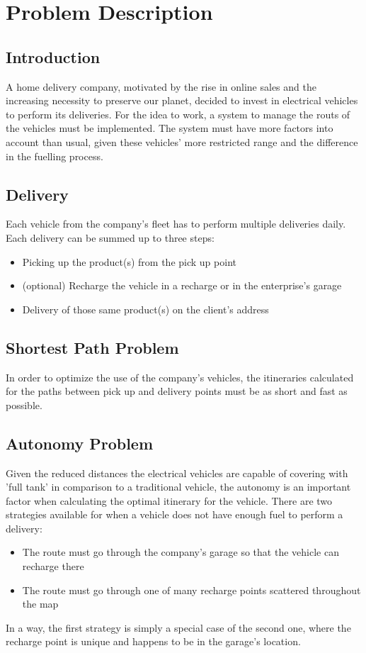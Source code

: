 \chapter{Problem Description}


\section{Introduction}
A home delivery company, motivated by the rise in online sales and the increasing necessity to preserve our planet, decided to invest in electrical vehicles to perform its deliveries. For the idea to work, a system to manage the routs of the vehicles must be implemented. The system must have more factors into account than usual, given these vehicles' more restricted range and the difference in the fuelling process.


\section{Delivery}
Each vehicle from the company's fleet has to perform multiple deliveries daily. Each delivery can be summed up to three steps:
\begin{itemize}
	\item Picking up the product(s) from the pick up point
	\item (optional) Recharge the vehicle in a recharge  or in the enterprise's garage
	\item Delivery of those same product(s) on the client's address
\end{itemize}


\section{Shortest Path Problem}
In order to optimize the use of the company's vehicles, the itineraries calculated for the paths between pick up and delivery points must be as short and fast as possible. 


\section{Autonomy Problem}
Given the reduced distances the electrical vehicles are capable of covering with 'full tank' in comparison to a traditional vehicle, the autonomy is an important factor when calculating the optimal itinerary for the vehicle. There are two strategies available for when a vehicle does not have enough fuel to perform a delivery:
\begin{itemize}
    \item The route must go through the company's  garage so that the vehicle can recharge there
    \item The route must go through one of many recharge points scattered throughout the map
\end{itemize}
In a way, the first strategy is simply a special case of the second one, where the recharge point is unique and happens to be in the garage's location.


